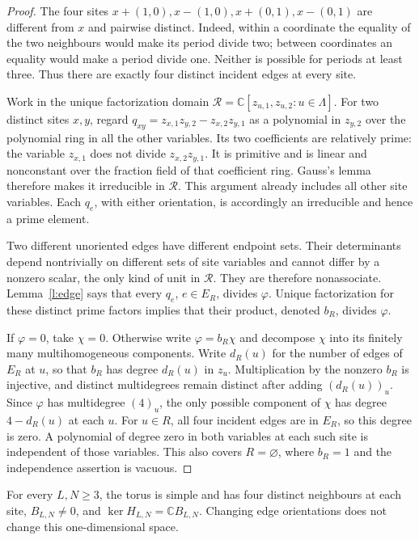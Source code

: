 \begin{proof}
The four sites \(x+(1,0),x-(1,0),x+(0,1),x-(0,1)\) are
different from \(x\) and pairwise distinct. Indeed, within a
coordinate the equality of the two neighbours would make its period
divide two; between coordinates an equality would make a period
divide one. Neither is possible for periods at least three.
Thus there are exactly four distinct incident edges at every site.

Work in the unique factorization domain
\(\mathcal R=\mathbb C[z_{u,1},z_{u,2}:u\in\Lambda]\).
For two distinct sites \(x,y\), regard
\(q_{xy}=z_{x,1}z_{y,2}-z_{x,2}z_{y,1}\) as a polynomial in
\(z_{y,2}\) over the polynomial ring in all the other variables.
Its two coefficients are relatively prime: the variable
\(z_{x,1}\) does not divide \(z_{x,2}z_{y,1}\).
It is primitive and is linear and nonconstant over the fraction
field of that coefficient ring. Gauss's lemma therefore makes it
irreducible in \(\mathcal R\). This argument already includes all
other site variables. Each \(q_e\), with either orientation, is
accordingly an irreducible and hence a prime element.

Two different unoriented edges have different endpoint sets.
Their determinants depend nontrivially on different sets of site
variables and cannot differ by a nonzero scalar, the only kind of
unit in \(\mathcal R\). They are therefore nonassociate.
Lemma~\ref{l:edge} says that every \(q_e\), \(e\in E_R\),
divides \(\varphi\). Unique factorization for these distinct prime
factors implies that their product, denoted \(b_R\), divides
\(\varphi\).

If \(\varphi=0\), take \(\chi=0\). Otherwise write
\(\varphi=b_R\chi\) and decompose \(\chi\) into its finitely
many multihomogeneous components. Write \(d_R(u)\) for the number
of edges of \(E_R\) at \(u\), so that \(b_R\) has degree
\(d_R(u)\) in \(z_u\). Multiplication by the nonzero \(b_R\)
is injective, and distinct multidegrees remain distinct after adding
\((d_R(u))_u\). Since \(\varphi\) has multidegree \((4)_u\),
the only possible component of \(\chi\) has degree
\(4-d_R(u)\) at each \(u\). For \(u\in R\), all four incident
edges are in \(E_R\), so this degree is zero. A polynomial of
degree zero in both variables at each such site is independent of
those variables. This also covers \(R=\varnothing\), where
\(b_R=1\) and the independence assertion is vacuous.
\end{proof}

\begin{proposition}\label{p:toruskernel}
For every \(L,N\ge3\), the torus is simple and has four distinct
neighbours at each site, \(B_{L,N}\ne0\), and
\(\ker H_{L,N}=\mathbb C B_{L,N}\).
Changing edge orientations does not change this one-dimensional space.
\end{proposition}


